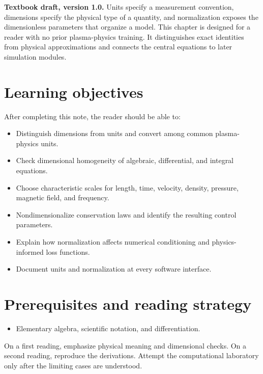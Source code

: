 \documentclass[11pt]{article}
\begin{document}

\begin{overviewbox}
\textbf{Textbook draft, version 1.0.} Units specify a measurement convention, dimensions specify the physical type of a quantity, and normalization exposes the dimensionless parameters that organize a model. This chapter is designed for a reader with no prior plasma-physics training. It distinguishes exact identities from physical approximations and connects the central equations to later simulation modules.
\end{overviewbox}

\ProjectTOC

\section{Learning objectives}
After completing this note, the reader should be able to:
\begin{itemize}[leftmargin=1.6em]
\item Distinguish dimensions from units and convert among common plasma-physics units.
\item Check dimensional homogeneity of algebraic, differential, and integral equations.
\item Choose characteristic scales for length, time, velocity, density, pressure, magnetic field, and frequency.
\item Nondimensionalize conservation laws and identify the resulting control parameters.
\item Explain how normalization affects numerical conditioning and physics-informed loss functions.
\item Document units and normalization at every software interface.
\end{itemize}

\section{Prerequisites and reading strategy}
\begin{itemize}[leftmargin=1.6em]
\item Elementary algebra, scientific notation, and differentiation.
\end{itemize}
On a first reading, emphasize physical meaning and dimensional checks. On a second reading, reproduce the derivations. Attempt the computational laboratory only after the limiting cases are understood.
\end{document}
